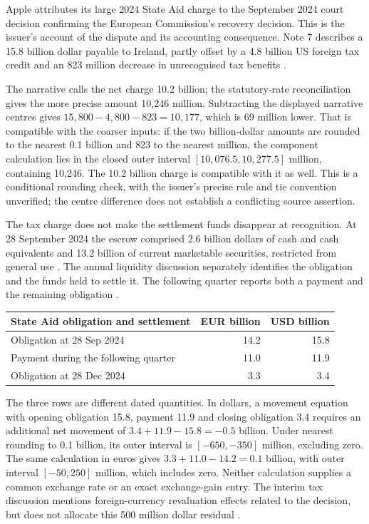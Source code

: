 Apple attributes its large 2024 State Aid charge to the September 2024 court
decision confirming the European Commission's recovery decision. This is the
issuer's account of the dispute and its accounting consequence. Note 7 describes
a 15.8 billion dollar payable to Ireland, partly offset by a 4.8 billion US
foreign tax credit and an 823 million decrease in unrecognised tax benefits
\citep[Note 7, printed pp.~39--40]{apple2024}.

The narrative calls the net charge 10.2 billion; the statutory-rate reconciliation
gives the more precise amount 10,246 million. Subtracting the displayed narrative
centres gives $15{,}800-4{,}800-823=10{,}177$, which is 69 million lower.
That is compatible with the coarser inputs: if the two billion-dollar amounts
are rounded to the nearest 0.1 billion and 823 to the nearest million, the
component calculation lies in the closed outer interval
$[10{,}076.5,10{,}277.5]$ million, containing 10,246. The 10.2 billion charge
is compatible with it as well. This is a conditional rounding check, with the
issuer's precise rule and tie convention unverified; the centre difference
does not establish a conflicting source assertion.

The tax charge does not make the settlement funds disappear at recognition.
At 28 September 2024 the escrow comprised 2.6 billion dollars of cash and cash
equivalents and 13.2 billion of current marketable securities, restricted from
general use \citep[Notes 4 and 7, printed pp.~37 and 39]{apple2024}.
The annual liquidity discussion separately identifies the obligation and the
funds held to settle it. The following quarter reports both a payment and the
remaining obligation \citep[printed p.~26]{apple2024}
\citep[printed p.~16]{apple2025q1}.

\begin{center}
\begin{tabularx}{\linewidth}{@{}Xrr@{}}
\toprule
State Aid obligation and settlement & EUR billion & USD billion\\\midrule
Obligation at 28 Sep 2024 & 14.2 & 15.8\\
Payment during the following quarter & 11.0 & 11.9\\
Obligation at 28 Dec 2024 & 3.3 & 3.4\\\bottomrule
\end{tabularx}
\end{center}

The three rows are different dated quantities. In dollars, a movement equation
with opening obligation 15.8, payment 11.9 and closing obligation 3.4 requires
an additional net movement of $3.4+11.9-15.8=-0.5$ billion. Under nearest
rounding to 0.1 billion, its outer interval is $[-650,-350]$ million, excluding
zero. The same calculation in euros gives $3.3+11.0-14.2=0.1$ billion, with
outer interval $[-50,250]$ million, which includes zero. Neither calculation
supplies a common exchange rate or an exact exchange-gain entry. The interim
tax discussion mentions foreign-currency revaluation effects related to the
decision, but does not allocate this 500 million dollar residual
\citep[printed p.~16]{apple2025q1}.

